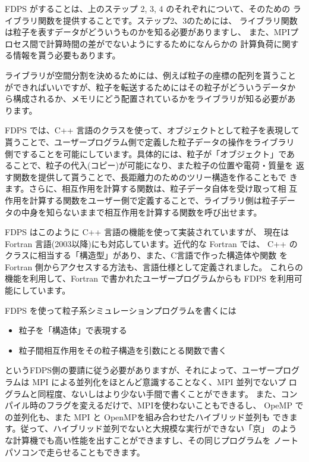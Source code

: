 \documentclass[twocolumn,10pt]{jarticle}
\begin{document}
FDPS がすることは、上のステップ 2, 3, 4 のそれぞれについて、そのための
ライブラリ関数を提供することです。ステップ2、3のためには、
ライブラリ関数は粒子を表すデータがどういうものかを知る必要がありますし、
また、MPIプロセス間で計算時間の差がでないようにするためになんらかの
計算負荷に関する情報を貰う必要もあります。

ライブラリが空間分割を決めるためには、例えば粒子の座標の配列を貰うこと
ができればいいですが、粒子を転送するためにはその粒子がどういうデータか
ら構成されるか、メモリにどう配置されているかをライブラリが知る必要があ
ります。

FDPS では、C++ 言語のクラスを使って、オブジェクトとして粒子を表現して
貰うことで、ユーザープログラム側で定義した粒子データの操作をライブラリ
側ですることを可能にしています。具体的には、粒子が「オブジェクト」であ
ることで、粒子の代入(コピー)が可能になり、また粒子の位置や電荷・質量を
返す関数を提供して貰うことで、長距離力のためのツリー構造を作ることもで
きます。さらに、相互作用を計算する関数は、粒子データ自体を受け取って相
互作用を計算する関数をユーザー側で定義することで、ライブラリ側は粒子デー
タの中身を知らないままで相互作用を計算する関数を呼び出せます。

FDPS はこのように C++ 言語の機能を使って実装されていますが、
現在はFortran 言語(2003以降)にも対応しています。近代的な Fortran では、
C++ のクラスに相当する「構造型」があり、また、C言語で作った構造体や関数
を Fortran 側からアクセスする方法も、言語仕様として定義されました。
これらの機能を利用して、Fortran で書かれたユーザープログラムからも
FDPS を利用可能にしています。

FDPS を使って粒子系シミュレーションプログラムを書くには

\begin{itemize}

\item 粒子を「構造体」で表現する
\item 粒子間相互作用をその粒子構造を引数にとる関数で書く
\end{itemize}

というFDPS側の要請に従う必要がありますが、それによって、ユーザープログ
ラムは MPI による並列化をほとんど意識することなく、MPI 並列でないプ
ログラムと同程度、ないしはより少ない手間で書くことができます。
また、コンパイル時のフラグを変えるだけで、MPIを使わないこともできるし、
OpeMP での並列化も、また MPI と OpenMPを組み合わせたハイブリッド並列も
できます。従って、ハイブリッド並列でないと大規模な実行ができない「京」
のような計算機でも高い性能を出すことができますし、その同じプログラムを
ノートパソコンで走らせることもできます。
\end{document}
